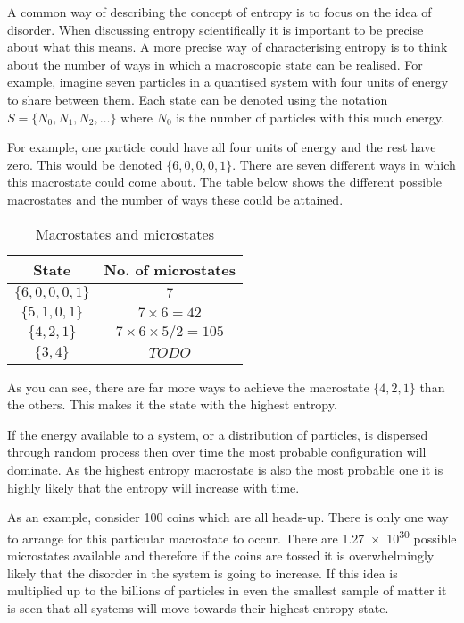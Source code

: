 \documentclass[revision-guide.tex]{subfiles}
\begin{document}
A common way of describing the concept of entropy is to focus on the idea of disorder. When discussing entropy scientifically it is important to be precise about what this means. A more precise way of characterising entropy is to think about the number of ways in which a macroscopic state can be realised. For example, imagine seven particles in a quantised system with four units of energy to share between them. Each state can be denoted using the notation $S = \{N_0,N_1,N_2,\ldots\}$ where $N_0$ is the number of particles with this much energy.

For example, one particle could have all four units of energy and the rest have zero. This would be denoted $\{6,0,0,0,1\}$. There are seven different ways in which this macrostate could come about. The table below shows the different possible macrostates and the number of ways these could be attained.

\begin{table}[h]
\begin{center}
  \begin{tabular}{c|c}
    \textbf{State} & \textbf{No. of microstates} \\ \hline
    $\{6,0,0,0,1\}$ & $ 7$ \\
    $\{5,1,0,1\}$ &  $7 \times 6 = 42$ \\
    $\{4,2,1\}$ & $ 7 \times 6 \times 5 / 2 = 105$ \\
    $\{3,4\}$ & $ TODO$
  \end{tabular}
\end{center}
  \caption{Macrostates and microstates}
  \label{tbl:macro}
\end{table}

As you can see, there are far more ways to achieve the macrostate $\{4,2,1\}$ than the others. This makes it the state with the highest entropy.


If the energy available to a system, or a distribution of particles, is dispersed through random process then over time the most probable configuration will dominate. As the highest entropy macrostate is also the most probable one it is highly likely that the entropy will increase with time.

As an example, consider 100 coins which are all heads-up. There is only one way to arrange for this particular macrostate to occur. There are \num{1.27e30} possible microstates available and therefore if the coins are tossed it is overwhelmingly likely that the disorder in the system is going to increase. If this idea is multiplied up to the billions of particles in even the smallest sample of matter it is seen that all systems will move towards their highest entropy state.
\end{document}
